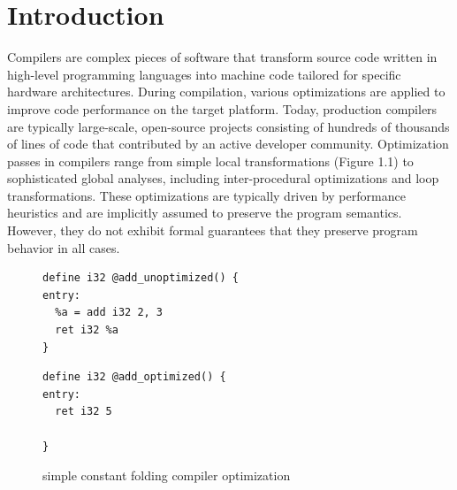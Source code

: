

\chapter{Introduction}

Compilers are complex pieces of software that transform source code written in high-level programming languages into machine code tailored for specific hardware architectures. During compilation, various optimizations are applied to improve code performance on the target platform. Today, production compilers are typically large-scale, open-source projects consisting of hundreds of thousands of lines of code that contributed by an active developer community. Optimization passes in compilers range from simple local transformations (Figure 1.1)  to sophisticated global analyses, including inter-procedural optimizations and loop transformations. These optimizations are typically driven by performance heuristics and are implicitly assumed to preserve the program semantics. However, they do not exhibit formal guarantees that they preserve program behavior in all cases. 

\begin{figure}[ht]
\centering
\begin{minipage}{0.45\textwidth}
\begin{lstlisting}
define i32 @add_unoptimized() {
entry:
  %a = add i32 2, 3
  ret i32 %a
}
\end{lstlisting}
\end{minipage}
\hspace{0.05\textwidth}
\begin{minipage}{0.45\textwidth}
\begin{lstlisting}
define i32 @add_optimized() {
entry:
  ret i32 5
  
}
\end{lstlisting}
\end{minipage}
\caption{simple constant folding compiler optimization}
\label{fig:llvm-constant-folding}
\end{figure}

